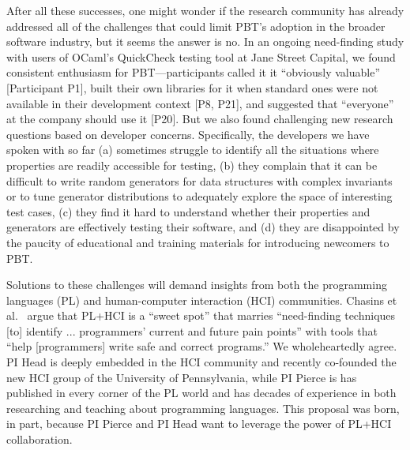 \newcommand{\participant}[1]{{P#1}}

After all these successes, one might wonder if the research community has already
addressed all of the challenges that could limit PBT's adoption
in the broader software industry, but it
seems the answer is no.
In an ongoing need-finding study with users of OCaml's QuickCheck testing tool
at Jane Street Capital, we found
consistent enthusiasm for PBT---participants called it it
``obviously valuable'' [Participant \participant{1}],
built their own libraries for it when standard ones were not available in their
development context [\participant{8},
\participant{21}], and suggested that ``everyone'' at the company should use it
[\participant{20}]. But we also found
challenging new research questions based on developer concerns.
Specifically, the developers we have spoken with so far
%
(a) sometimes struggle
to identify all the situations where properties are readily accessible for
testing,
%
(b) they complain that it
can be difficult to write random generators for data structures
with complex invariants or to tune generator distributions to
adequately explore the space of interesting test cases,
%
(c) they find
it hard to understand whether their properties and generators are
effectively testing their software, and
%
(d) they are disappointed by
the paucity of educational and training materials for introducing
newcomers to PBT.\iflater{}\fi

Solutions to these challenges will demand insights from both the
programming languages (PL) and
human-computer interaction (HCI) communities.  Chasins et
al.~\cite{chasins_pl_2021} argue that PL+HCI is a ``sweet spot'' that marries
``need-finding techniques [to] identify ...  programmers' current and future
pain points'' with tools that ``help [programmers] write safe and correct
programs.'' We wholeheartedly agree.
PI Head
is deeply embedded in the HCI community and recently co-founded the new HCI
group of the University of Pennsylvania, while PI Pierce is has published in
every corner of the PL world and has decades of experience in both researching
and teaching about programming languages.
This proposal was born, in part, because PI
Pierce and PI Head want to leverage the power of PL+HCI collaboration.  

